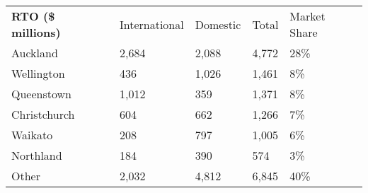 \begin{tabular}[t]{p{2cm}>{\hfill}p{1.45cm}>{\hfill}p{1cm}>{\hfill}p{0.9cm}>{\hfill}p{1.35cm}}
 \textbf{RTO (\$ millions)} & International & Domestic & Total & Market Share \\ 
 Auckland & 2,684 & 2,088 & 4,772 & 28\% \\ 
  Wellington & 436 & 1,026 & 1,461 & 8\% \\ 
  Queenstown & 1,012 & 359 & 1,371 & 8\% \\ 
  Christchurch & 604 & 662 & 1,266 & 7\% \\ 
  Waikato & 208 & 797 & 1,005 & 6\% \\ 
  Northland & 184 & 390 & 574 & 3\% \\ 
  Other & 2,032 & 4,812 & 6,845 & 40\% \\ 
  \end{tabular}
